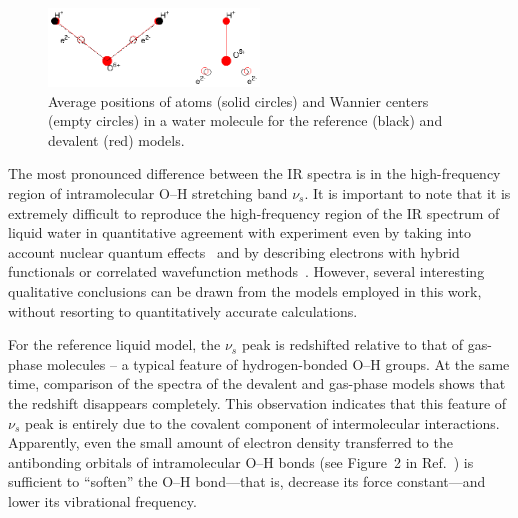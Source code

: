 \documentclass[journal=jacsat,manuscript=article]{achemso}
\begin{document}
\begin{figure}
\includegraphics[width=0.5\textwidth]{acoord}
\caption{Average positions of atoms (solid circles) and Wannier centers (empty circles) in a water molecule for the reference (black) and devalent (red) models. 
} \label{Fig:acoord}
\end{figure}

The most pronounced difference between the IR spectra is in the high-frequency region of intramolecular O--H stretching band $\nu_s$. 
%
It is important to note that it is extremely difficult to reproduce the high-frequency region of the IR spectrum of liquid water in quantitative agreement with experiment even by taking into account nuclear quantum effects~\cite{marsalek2017quantum} and by describing electrons with hybrid functionals or correlated wavefunction methods~\cite{medders2015infrared}. 
However, several interesting qualitative conclusions can be drawn from the models employed in this work, without resorting to quantitatively accurate calculations. 

For the reference liquid model, the $\nu_s$ peak is redshifted relative to that of gas-phase molecules -- a typical feature of hydrogen-bonded O--H groups.
At the same time, comparison of the spectra of the devalent and gas-phase models shows that the redshift disappears completely. 
This observation indicates that this feature of $\nu_s$ peak is entirely due to the covalent component of intermolecular interactions. 
Apparently, even the small amount of electron density transferred to the antibonding orbitals of intramolecular O--H bonds (see Figure~2 in Ref.~) is sufficient to ``soften'' the O--H bond---that is, decrease its force constant---and lower its vibrational frequency. 
\end{document}
